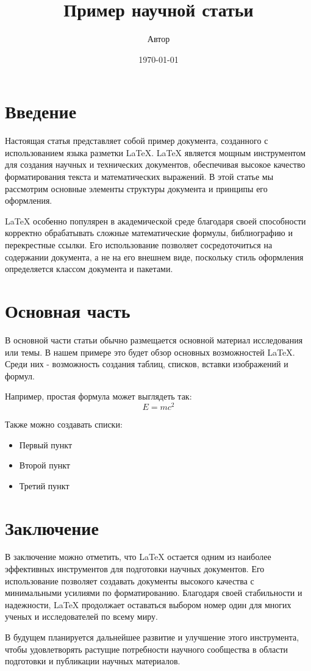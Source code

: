 \documentclass{article}
\title{Пример научной статьи}
\author{Автор}
\date{\today}
\begin{document}
\maketitle

\section{Введение}
Настоящая статья представляет собой пример документа, созданного с использованием языка разметки LaTeX. LaTeX является мощным инструментом для создания научных и технических документов, обеспечивая высокое качество форматирования текста и математических выражений. В этой статье мы рассмотрим основные элементы структуры документа и принципы его оформления.

LaTeX особенно популярен в академической среде благодаря своей способности корректно обрабатывать сложные математические формулы, библиографию и перекрестные ссылки. Его использование позволяет сосредоточиться на содержании документа, а не на его внешнем виде, поскольку стиль оформления определяется классом документа и пакетами.

\section{Основная часть}
В основной части статьи обычно размещается основной материал исследования или темы. В нашем примере это будет обзор основных возможностей LaTeX. Среди них - возможность создания таблиц, списков, вставки изображений и формул.

Например, простая формула может выглядеть так:
\begin{equation}
E = mc^2
\end{equation}

Также можно создавать списки:
\begin{itemize}
\item Первый пункт
\item Второй пункт
\item Третий пункт
\end{itemize}

\section{Заключение}
В заключение можно отметить, что LaTeX остается одним из наиболее эффективных инструментов для подготовки научных документов. Его использование позволяет создавать документы высокого качества с минимальными усилиями по форматированию. Благодаря своей стабильности и надежности, LaTeX продолжает оставаться выбором номер один для многих ученых и исследователей по всему миру.

В будущем планируется дальнейшее развитие и улучшение этого инструмента, чтобы удовлетворять растущие потребности научного сообщества в области подготовки и публикации научных материалов.
\end{document}
